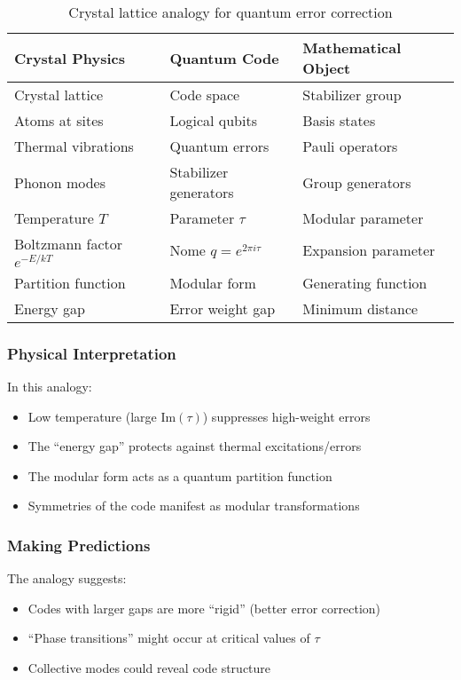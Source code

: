 \documentclass[11pt,a4paper]{article}
\newcommand{\Im}{\mathrm{Im}}
\begin{document}
\begin{table}[h]
\centering
\begin{tabular}{|l|l|l|}
\hline
\textbf{Crystal Physics} & \textbf{Quantum Code} & \textbf{Mathematical Object} \\
\hline
Crystal lattice & Code space & Stabilizer group \\
Atoms at sites & Logical qubits & Basis states \\
Thermal vibrations & Quantum errors & Pauli operators \\
Phonon modes & Stabilizer generators & Group generators \\
Temperature $T$ & Parameter $\tau$ & Modular parameter \\
Boltzmann factor $e^{-E/kT}$ & Nome $q = e^{2\pi i\tau}$ & Expansion parameter \\
Partition function & Modular form & Generating function \\
Energy gap & Error weight gap & Minimum distance \\
\hline
\end{tabular}
\caption{Crystal lattice analogy for quantum error correction}
\end{table}

\subsubsection{Physical Interpretation}
In this analogy:
\begin{itemize}
\item Low temperature (large $\Im(\tau)$) suppresses high-weight errors
\item The ``energy gap'' protects against thermal excitations/errors
\item The modular form acts as a quantum partition function
\item Symmetries of the code manifest as modular transformations
\end{itemize}

\subsubsection{Making Predictions}
The analogy suggests:
\begin{itemize}
\item Codes with larger gaps are more ``rigid'' (better error correction)
\item ``Phase transitions'' might occur at critical values of $\tau$
\item Collective modes could reveal code structure
\end{itemize}
\end{document}
